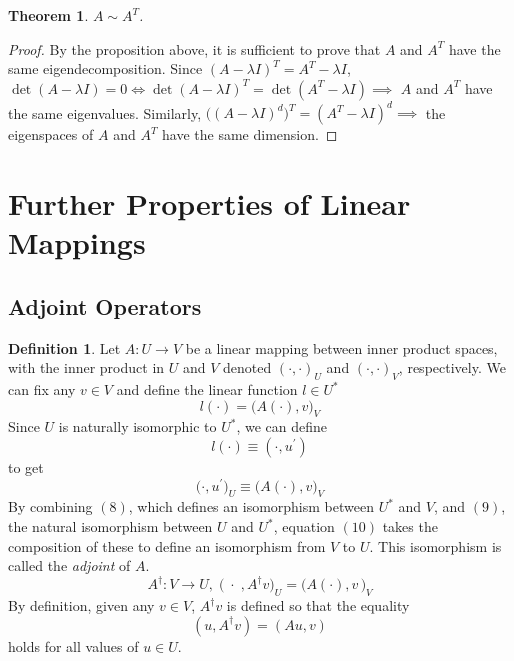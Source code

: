 \documentclass{article}
\newtheorem{theorem}{Theorem}[section]
\theoremstyle{remark}
\theoremstyle{definition}
\newtheorem{definition}{Definition}[section]
\begin{document}
    \begin{theorem}
    $A \sim A^T$. 
    \end{theorem}
    \begin{proof}
    By the proposition above, it is sufficient to prove that $A$ and $A^T$ have the same eigendecomposition. Since $(A - \lambda I)^T = A^T - \lambda I$, $\det{(A - \lambda I)} = 0 \iff \det{(A - \lambda I)^T} = \det{(A^T - \lambda I)} \implies $ $A$ and $A^T$ have the same eigenvalues. Similarly, $\big( (A - \lambda I)^d \big)^T = (A^T - \lambda I)^d \implies$ the eigenspaces of $A$ and $A^T$ have the same dimension. 
    \end{proof}

\section{Further Properties of Linear Mappings}

  \subsection{Adjoint Operators}

    \begin{definition}
    Let $A: U \longrightarrow V$ be a linear mapping between inner product spaces, with the inner product in $U$ and $V$ denoted $(\cdot,\cdot)_U$ and $(\cdot,\cdot)_V$, respectively. We can fix any $v \in V$ and define the linear function $l \in U^*$
    \begin{equation}
        l(\cdot) = \big(A(\cdot), v\big)_V
    \end{equation}
    Since $U$ is naturally isomorphic to $U^*$, we can define
    \begin{equation}
        l(\cdot) \equiv (\cdot, u^\prime)
    \end{equation} 
    to get 
    \begin{equation}
        \big(\cdot, u^\prime \big)_U \equiv \big(A(\cdot), v \big)_V
    \end{equation}
    By combining $(8)$, which defines an isomorphism between $U^*$ and $V$, and $(9)$, the natural isomorphism between $U$ and $U^*$, equation $(10)$ takes the composition of these to define an isomorphism from $V$ to $U$. This isomorphism is called the \textit{adjoint} of $A$. 
    \[A^\dagger: V \longrightarrow U, \;  \big(\; \cdot \;, A^\dagger v \big)_U = \big( A(\cdot), v \,\big)_V \]
    By definition, given any $v \in V$, $A^\dagger v$ is defined so that the equality
    \[(u, A^\dagger v) = (A u, v)\]
    holds for all values of $u \in U$. 
    \end{definition}
\end{document}
